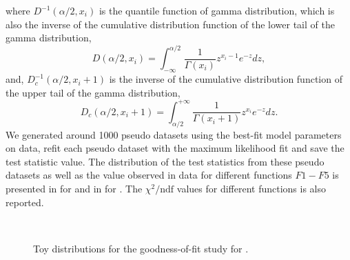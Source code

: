 where $D^{-1}(\alpha/2, x_{i})$ is the quantile function of gamma distribution, which is also the inverse of the cumulative distribution
function of the lower tail of the gamma distribution, 
\begin{equation}
D(\alpha/2, x_{i}) = \int_{-\infty}^{\alpha/2} \frac{1}{\Gamma(x_{i})} z^{x_{i}-1}e^{-z}dz,
\end{equation}
and, $D_{c}^{-1}(\alpha/2, x_{i}+1)$ is the inverse of the cumulative distribution function of the upper tail of the gamma distribution,
\begin{equation}
D_{c}(\alpha/2, x_{i}+1) = \int^{+\infty}_{\alpha/2} \frac{1}{\Gamma(x_{i}+1)} z^{x_{i}}e^{-z}dz.
\end{equation}
We generated around 1000 pseudo datasets using the best-fit model parameters on data, refit each pseudo dataset with the maximum likelihood fit and save
the test statistic value. The distribution of the test statistics from these pseudo datasets as well as the value observed in data for different functions
$F1-F5$ is presented in \fig{\ref{fig:qstarchi2}} for \qstar and in \fig{\ref{fig:bstarchi2}} for \bstar. The $\chi^{2}/\textrm{ndf}$ values for different functions
is also reported.

\begin{figure}[htbp]
\begin{center}
\\
\caption{Toy distributions for the goodness-of-fit study for \qstar.}
\label{fig:qstarchi2}
\end{center}
\end{figure}

